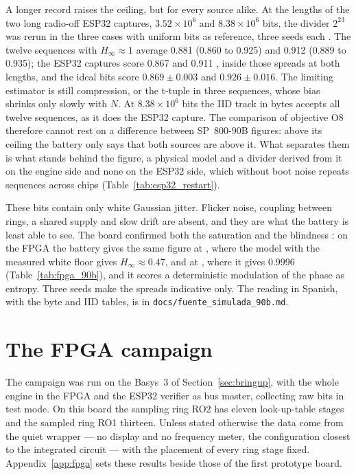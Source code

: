 A longer record raises the ceiling, but for every source alike. At the
lengths of the two long radio-off ESP32 captures, $3.52 \times 10^6$ and
$8.38 \times 10^6$ bits, the divider $2^{23}$ was rerun in the three cases
with uniform bits as reference, three seeds each \simu{}. The twelve
sequences with $H_\infty \approx 1$ average 0.881 (0.860 to 0.925) and
0.912 (0.889 to 0.935); the ESP32 captures score 0.867 and 0.911
\meas{}, inside those spreads at both lengths, and the ideal bits score
$0.869 \pm 0.003$ and $0.926 \pm 0.016$. The limiting estimator is still
compression, or the t-tuple in three sequences, whose bias shrinks only
slowly with $N$. At $8.38 \times 10^6$ bits the IID track in bytes
accepts all twelve sequences, as it does the ESP32 capture. The
comparison of objective O8 therefore cannot rest on a difference between
SP~800-90B figures: above its ceiling the battery only says that both
sources are above it. What separates them is what stands behind the
figure, a physical model and a divider derived from it on the engine side
and none on the ESP32 side, which without boot noise repeats sequences
across chips (Table~\ref{tab:esp32_restart}).

These bits contain only white Gaussian jitter. Flicker noise, coupling
between rings, a shared supply and slow drift are absent, and they are
what the battery is least able to see. The board confirmed both the
saturation and the blindness \meas{}: on the \ac{FPGA} the battery gives
the same figure at , where the model with the measured white floor
gives $H_\infty \approx 0.47$, and at , where it gives 0.9996
(Table~\ref{tab:fpga_90b}), and it scores a deterministic modulation of
the phase as entropy. Three seeds make the spreads indicative only. The reading in Spanish, with
the byte and IID tables, is in \nolinkurl{docs/fuente_simulada_90b.md}.

\section{The FPGA campaign}
\label{sec:campaign}

The campaign was run on the Basys~3 of Section~\ref{sec:bringup}, with
the whole engine in the \ac{FPGA} and the ESP32 verifier as bus master,
collecting raw bits in test mode. On this board the sampling ring RO2 has
eleven look-up-table stages and the sampled ring RO1 thirteen. Unless
stated otherwise the data come from the quiet wrapper --- no display and
no frequency meter, the configuration closest to the integrated circuit
--- with the placement of every ring stage fixed. Appendix~\ref{app:fpga}
sets these results beside those of the first prototype board.


